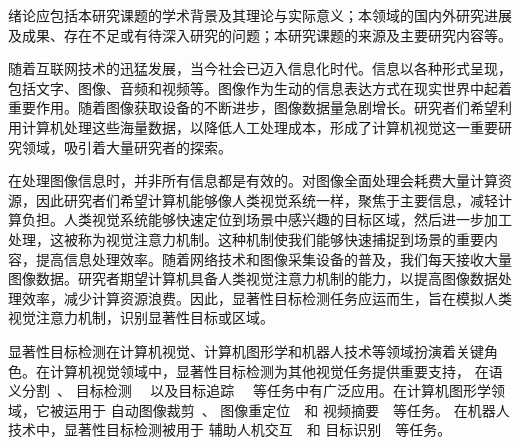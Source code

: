 



%
%
%
%
%
%
%
%
%
%
%


绪论应包括本研究课题的学术背景及其理论与实际意义；本领域的国内外研究进展及成果、存在不足或有待深入研究的问题；本研究课题的来源及主要研究内容等。
\label{chap:part1}

随着互联网技术的迅猛发展，当今社会已迈入信息化时代。信息以各种形式呈现，包括文字、图像、音频和视频等。图像作为生动的信息表达方式在现实世界中起着重要作用。随着图像获取设备的不断进步，图像数据量急剧增长。研究者们希望利用计算机处理这些海量数据，以降低人工处理成本，形成了计算机视觉这一重要研究领域，吸引着大量研究者的探索。

在处理图像信息时，并非所有信息都是有效的。对图像全面处理会耗费大量计算资源，因此研究者们希望计算机能够像人类视觉系统一样，聚焦于主要信息，减轻计算负担。人类视觉系统能够快速定位到场景中感兴趣的目标区域，然后进一步加工处理，这被称为视觉注意力机制。这种机制使我们能够快速捕捉到场景的重要内容，提高信息处理效率。随着网络技术和图像采集设备的普及，我们每天接收大量图像数据。研究者期望计算机具备人类视觉注意力机制的能力，以提高图像数据处理效率，减少计算资源浪费。因此，显著性目标检测任务应运而生，旨在模拟人类视觉注意力机制，识别显著性目标或区域。


显著性目标检测在计算机视觉、计算机图形学和机器人技术等领域扮演着关键角色。在计算机视觉领域中，显著性目标检测为其他视觉任务提供重要支持，
在语义分割~\cite{li2014secrets}、
目标检测~\cite{dai2016r}~
以及目标追踪~\cite{smeulders2013visual}~
等任务中有广泛应用。在计算机图形学领域，它被运用于
自动图像裁剪~\cite{wang2018deep}、
图像重定位~\cite{sun2011scale}~和
视频摘要~\cite{ma2002user}~等任务。
在机器人技术中，显著性目标检测被用于
辅助人机交互~\cite{sugano2010calibration}~和
目标识别~\cite{karpathy2013object}~等任务。

